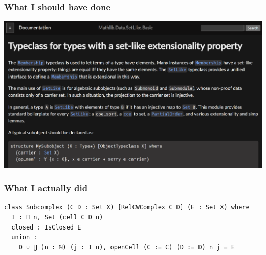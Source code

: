 \documentclass{beamer}
\begin{document}
\begin{frame}
\frametitle{What I should have done}
\includegraphics[width=\textwidth]{SetLikeDocs}
\end{frame}

\begin{frame}[fragile]
\frametitle{What I actually did}
\begin{lstlisting}[basicstyle=\ttfamily\footnotesize]
class Subcomplex (C D : Set X) [RelCWComplex C D] (E : Set X) where
  I : Π n, Set (cell C D n)
  closed : IsClosed E
  union : 
    D ∪ ⋃ (n : ℕ) (j : I n), openCell (C := C) (D := D) n j = E
\end{lstlisting}
\end{frame}
\end{document}
